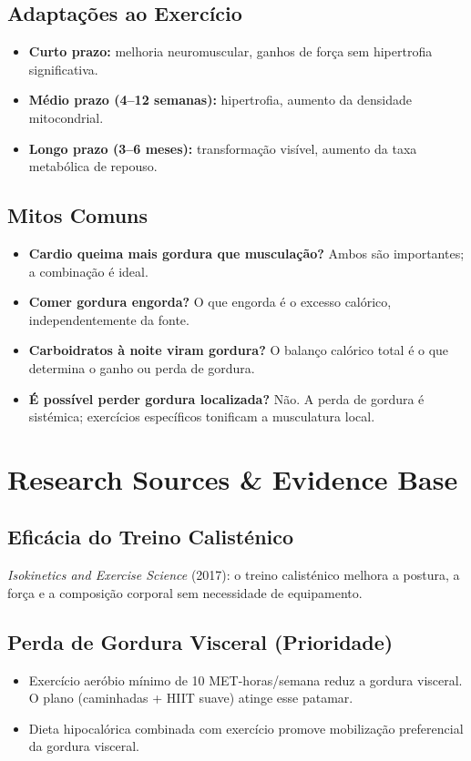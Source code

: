 \documentclass[12pt,a4paper]{scrartcl}
\begin{document}
\subsection{Adaptações ao Exercício}
\begin{itemize}
    \item \textbf{Curto prazo:} melhoria neuromuscular, ganhos de força sem hipertrofia significativa.
    \item \textbf{Médio prazo (4–12 semanas):} hipertrofia, aumento da densidade mitocondrial.
    \item \textbf{Longo prazo (3–6 meses):} transformação visível, aumento da taxa metabólica de repouso.
\end{itemize}

\subsection{Mitos Comuns}
\begin{itemize}
    \item \textbf{Cardio queima mais gordura que musculação?} Ambos são importantes; a combinação é ideal.
    \item \textbf{Comer gordura engorda?} O que engorda é o excesso calórico, independentemente da fonte.
    \item \textbf{Carboidratos à noite viram gordura?} O balanço calórico total é o que determina o ganho ou perda de gordura.
    \item \textbf{É possível perder gordura localizada?} Não. A perda de gordura é sistémica; exercícios específicos tonificam a musculatura local.
\end{itemize}

\section{Research Sources \& Evidence Base}
\subsection{Eficácia do Treino Calisténico}
\textit{Isokinetics and Exercise Science} (2017): o treino calisténico melhora a postura, a força e a composição corporal sem necessidade de equipamento.

\subsection{Perda de Gordura Visceral (Prioridade)}
\begin{itemize}
    \item Exercício aeróbio mínimo de 10 MET-horas/semana reduz a gordura visceral. O plano (caminhadas + HIIT suave) atinge esse patamar.
    \item Dieta hipocalórica combinada com exercício promove mobilização preferencial da gordura visceral.
\end{itemize}
\end{document}
